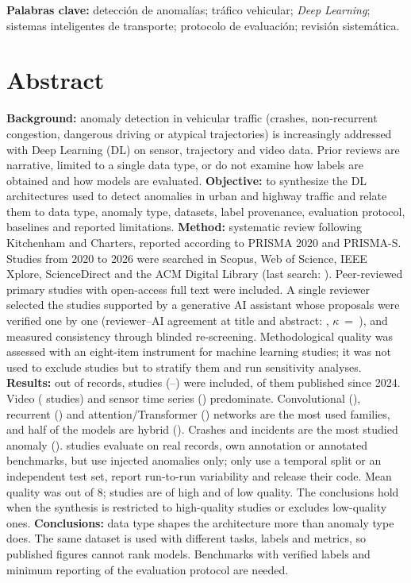 \documentclass[12pt, a4paper]{article}
\begin{document}
\noindent\textbf{Palabras clave:} detección de anomalías; tráfico vehicular; \textit{Deep Learning}; sistemas inteligentes de transporte; protocolo de evaluación; revisión sistemática.

\section*{Abstract}
\textbf{Background:} anomaly detection in vehicular traffic (crashes, non-recurrent congestion, dangerous driving or atypical trajectories) is increasingly addressed with Deep Learning (DL) on sensor, trajectory and video data. Prior reviews are narrative, limited to a single data type, or do not examine how labels are obtained and how models are evaluated.
\textbf{Objective:} to synthesize the DL architectures used to detect anomalies in urban and highway traffic and relate them to data type, anomaly type, datasets, label provenance, evaluation protocol, baselines and reported limitations.
\textbf{Method:} systematic review following Kitchenham and Charters, reported according to PRISMA 2020 and PRISMA-S. Studies from 2020 to 2026 were searched in Scopus, Web of Science, IEEE Xplore, ScienceDirect and the ACM Digital Library (last search: \FechaBusquedaEN). Peer-reviewed primary studies with open-access full text were included. A single reviewer selected the studies supported by a generative AI assistant whose proposals were verified one by one (reviewer--AI agreement at title and abstract: \AcuerdoIATA, $\kappa$~=~\KappaIATA), and measured consistency through blinded re-screening. Methodological quality was assessed with an eight-item instrument for machine learning studies; it was not used to exclude studies but to stratify them and run sensitivity analyses.
\textbf{Results:} out of \Pidentificados{} records, \Nestudios{} studies (\AnioMin--\AnioMax) were included, \NrecientesVeintidosVeintiseis{} of them published since 2024. Video (\NdatoVideo{} studies) and sensor time series (\NdatoSensores) predominate. Convolutional (\NfamConv), recurrent (\NfamRec) and attention/Transformer (\NfamTransf) networks are the most used families, and half of the models are hybrid (\Nhibrido). Crashes and incidents are the most studied anomaly (\PcatA). \NetiqRealesTotal{} studies evaluate on real records, own annotation or annotated benchmarks, but \NetiqInyect{} use injected anomalies only; only \STodosPartOK{} use a temporal split or an independent test set, \Nvariabilidad{} report run-to-run variability and \NcodigoURL{} release their code. Mean quality was \QAmedia{} out of 8; \NaltaCalidad{} studies are of high and \NbajaCalidad{} of low quality. The conclusions hold when the synthesis is restricted to high-quality studies or excludes low-quality ones.
\textbf{Conclusions:} data type shapes the architecture more than anomaly type does. The same dataset is used with different tasks, labels and metrics, so published figures cannot rank models. Benchmarks with verified labels and minimum reporting of the evaluation protocol are needed.
\end{document}
